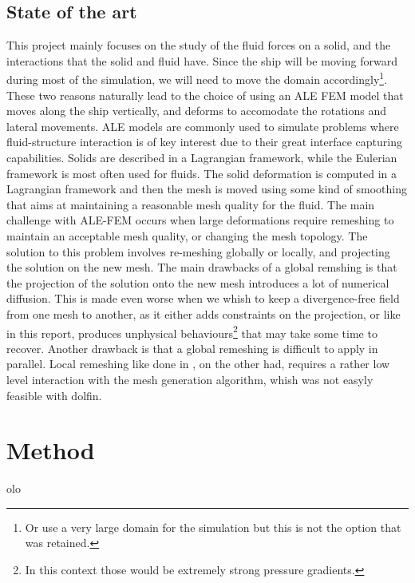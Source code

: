 \documentclass[a4paper]{article}
\begin{document}
\subsection{State of the art}
This project mainly focuses on the study of the fluid forces on a solid, and the interactions that the solid and fluid have. Since the ship will be moving forward during most of the simulation, we will need to move the domain accordingly\footnote{Or use a very large domain for the simulation but this is not the option that was retained.}. These two reasons naturally lead to the choice of using an ALE FEM model that moves along the ship vertically, and deforms to accomodate the rotations and lateral movements. ALE models are commonly used to simulate problems where fluid-structure interaction is of key interest\cite{Jeannette2020Apr}\cite{Wang2018Jul} due to their great interface capturing capabilities. Solids are described in a Lagrangian framework, while the Eulerian framework is most often used for fluids. The solid deformation is computed in a Lagrangian framework and then the mesh is moved using some kind of smoothing that aims at maintaining a reasonable mesh quality for the fluid.  The main challenge with ALE-FEM occurs when large deformations require remeshing to maintain an acceptable mesh quality, or changing the mesh topology. The solution to this problem involves re-meshing globally or locally, and projecting the solution on the new mesh\cite{Remacle2010May}. The main drawbacks of a global remshing is that the projection of the solution onto the new mesh introduces a lot of numerical diffusion. This is made even worse when we whish to keep a divergence-free field from one mesh to another, as it either adds constraints on the projection, or like in this report, produces unphysical behaviours\footnote{In this context those would be extremely strong pressure gradients.} that may take some time to recover. Another drawback is that a global remeshing is difficult to apply in parallel. Local remeshing like done in \cite{Remacle2010May}, on the other had, requires a rather low level interaction with the mesh generation algorithm, whish was not easyly feasible with dolfin.

\section{Method}
olo


\newpage


\end{document}
